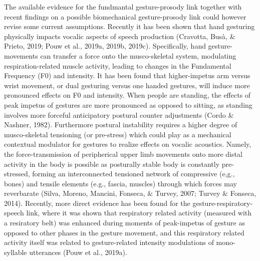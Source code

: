 \documentclass[
  man, noextraspace,floatsintext]{apa6}
\begin{document}
The available evidence for the fundmantal gesture-prosody link together with recent findings on a possible biomechanical gesture-prosody link could however revise some current assumptions. Recently it has been shown that hand gesturing physically impacts vocalic aspects of speech production (Cravotta, Busà, \& Prieto, 2019; Pouw et al., 2019a, 2019b, 2019c). Specifically, hand gesture-movements can transfer a force onto the musco-skeletal system, modulating respiration-related muscle activity, leading to changes in the Fundamental Frequency (F0) and intensity. It has been found that higher-impetus arm versus wrist movement, or dual gesturing versus one handed gestures, will induce more pronounced effects on F0 and intensity. When people are standing, the effects of peak impetus of gestures are more pronounced as opposed to sitting, as standing involves more forceful anticipatory postural counter adjustments (Cordo \& Nashner, 1982). Furthermore postural instability requires a higher degree of musco-skeletal tensioning (or pre-stress) which could play as a mechanical contextual modulator for gestures to realize effects on vocalic acoustics. Namely, the force-transmission of peripherical upper limb movements onto more distal activity in the body is possible as posturally stable body is constantly pre-stressed, forming an interconnected tensioned network of compressive (e,g., bones) and tensile elements (e.g., fascia, muscles) through which forces may reverbarate (Silva, Moreno, Mancini, Fonseca, \& Turvey, 2007; Turvey \& Fonseca, 2014). Recently, more direct evidence has been found for the gesture-respiratory-speech link, where it was shown that respiratory related activity (measured with a resiratory belt) was enhanced during moments of peak-impetus of gesture as opposed to other phases in the gesture movement, and this respiratory related activity itself was related to gesture-related intensity modulations of mono-syllable utterances (Pouw et al., 2019a).\\
\end{document}
